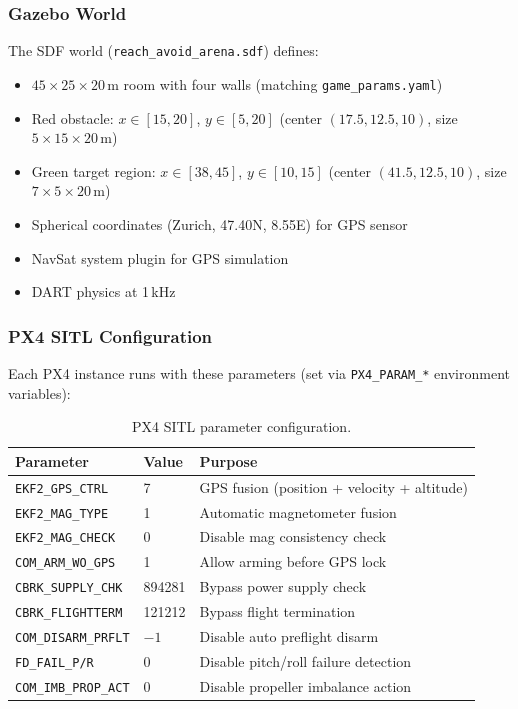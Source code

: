 \documentclass[11pt,a4paper]{article}
\begin{document}
\subsubsection{Gazebo World}

The SDF world (\texttt{reach\_avoid\_arena.sdf}) defines:
\begin{itemize}[noitemsep]
    \item $45 \times 25 \times 20$\,m room with four walls (matching \texttt{game\_params.yaml})
    \item Red obstacle: $x \in [15,20]$, $y \in [5,20]$ (center $(17.5, 12.5, 10)$, size $5 \times 15 \times 20$\,m)
    \item Green target region: $x \in [38,45]$, $y \in [10,15]$ (center $(41.5, 12.5, 10)$, size $7 \times 5 \times 20$\,m)
    \item Spherical coordinates (Zurich, 47.40\textdegree N, 8.55\textdegree E) for GPS sensor
    \item NavSat system plugin for GPS simulation
    \item DART physics at 1\,kHz
\end{itemize}

\subsubsection{PX4 SITL Configuration}

Each PX4 instance runs with these parameters (set via \texttt{PX4\_PARAM\_*} environment variables):

\begin{table}[h]
\centering
\small
\caption{PX4 SITL parameter configuration.}
\begin{tabular}{llp{6cm}}
\toprule
\textbf{Parameter} & \textbf{Value} & \textbf{Purpose} \\
\midrule
\texttt{EKF2\_GPS\_CTRL} & 7 & GPS fusion (position + velocity + altitude) \\
\texttt{EKF2\_MAG\_TYPE} & 1 & Automatic magnetometer fusion \\
\texttt{EKF2\_MAG\_CHECK} & 0 & Disable mag consistency check \\
\texttt{COM\_ARM\_WO\_GPS} & 1 & Allow arming before GPS lock \\
\texttt{CBRK\_SUPPLY\_CHK} & 894281 & Bypass power supply check \\
\texttt{CBRK\_FLIGHTTERM} & 121212 & Bypass flight termination \\
\texttt{COM\_DISARM\_PRFLT} & $-1$ & Disable auto preflight disarm \\
\texttt{FD\_FAIL\_P/R} & 0 & Disable pitch/roll failure detection \\
\texttt{COM\_IMB\_PROP\_ACT} & 0 & Disable propeller imbalance action \\
\bottomrule
\end{tabular}
\end{table}
\end{document}
